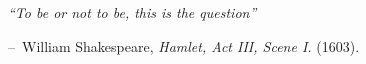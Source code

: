 \makeatletter
\newenvironment{chapquote}[2][-2.5em]
  {\setlength{\@tempdima}{#1}%
   \def\chapquote@author{#2}%
   \parshape 1 \@tempdima \dimexpr\textwidth-1\@tempdima\relax%
   \itshape}
  {\par\normalfont\hfill--\ \chapquote@author\hspace*{\@tempdima}\par\bigskip}
\makeatother

\vspace*{\fill}
\begin{chapquote}{William Shakespeare, \textit{Hamlet, Act III, Scene I.} (1603).}
``To be or not to be, this is the question''\\
\end{chapquote}
\vspace*{\fill} %

